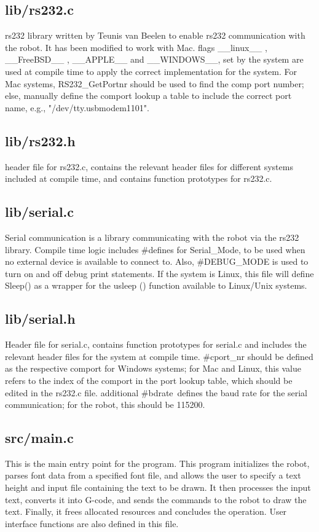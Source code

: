 \subsection{lib/rs232.c}

rs232 library written by Teunis van Beelen to enable rs232 communication with the robot. It has been modified to work with Mac. flags \_\_linux\_\_ , \_\_FreeBSD\_\_ , \_\_APPLE\_\_ and \_\_WINDOWS\_\_, set by the system are used at compile time to apply the correct implementation for the system. For Mac systems, RS232\_GetPortnr should be used to find the comp port number; else, manually define the comport lookup a table to include the correct port name, e.g., "/dev/tty.usbmodem1101".
\subsection{lib/rs232.h}
header file for rs232.c, contains the relevant header files for different systems included at compile time, and contains function prototypes for rs232.c.

\subsection{lib/serial.c}
Serial communication is a library communicating with the robot via the rs232 library. Compile time logic includes \#defines for Serial\_Mode, to be used when no external device is available to connect to. Also, \#DEBUG\_MODE is used to turn on and off debug print statements. If the system is Linux, this file will define Sleep() as a wrapper for the usleep () function available to Linux/Unix systems.
\subsection{lib/serial.h}
Header file for serial.c, contains function prototypes for serial.c and includes the relevant header files for the system at compile time. \#cport\_nr should be defined as the respective comport for Windows systems; for Mac and Linux, this value refers to the index of the comport in the port lookup table, which should be edited in the rs232.c file. additional \#bdrate\ defines the baud rate for the serial communication; for the robot, this should be 115200.

\subsection{src/main.c}
This is the main entry point for the program. This program initializes the robot, parses font data from a specified font file, and allows the user to specify a text height and input file containing the text to be drawn. It then processes the input text, converts it into G-code, and sends the commands to the robot to draw the text. Finally, it frees allocated resources and concludes the operation. User interface functions are also defined in this file.
